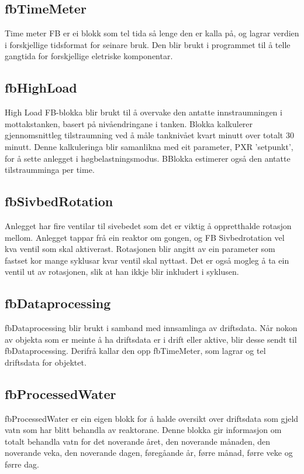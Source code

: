 \subsection{fbTimeMeter}
Time meter \gls{FB} er ei blokk som tel tida så lenge den er kalla på, og lagrar verdien i forskjellige tidsformat for seinare bruk.
Den blir brukt i programmet til å telle gangtida for forskjellige eletriske komponentar.

\subsection{fbHighLoad}
High Load \gls{FB}-blokka blir brukt til å overvake den antatte innstraumningen i mottakstanken, basert på nivåendringane i tanken.
Blokka kalkulerer gjennomsnittleg tilstraumning ved å måle tanknivået kvart minutt over totalt 30 minutt.
Denne kalkuleringa blir samanlikna med eit parameter, PXR 'setpunkt', for å sette anlegget i høgbelastningsmodus.
BBlokka estimerer også den antatte tilstraumminga per time.

\subsection{fbSivbedRotation}
Anlegget har fire ventilar til sivebedet som det er viktig å oppretthalde rotasjon mellom. Anlegget tappar frå ein reaktor om gongen, 
og \gls{FB} Sivbedrotation vel kva ventil som skal aktiverast.
Rotasjonen blir angitt av ein parameter som fastset kor mange syklusar kvar ventil skal nyttast. 
Det er også mogleg å ta ein ventil ut av rotasjonen, slik at han ikkje blir inkludert i syklusen.

\subsection{fbDataprocessing}
fbDataprocessing blir brukt i samband med innsamlinga av driftsdata. 
Når nokon av objekta som er meinte å ha driftsdata er i drift eller aktive, blir desse sendt til fbDataprocessing. Derifrå kallar den opp fbTimeMeter, som lagrar og tel driftsdata for objektet.

\subsection{fbProcessedWater}
fbProcessedWater er ein eigen blokk for å halde oversikt over driftsdata som gjeld vatn som har blitt behandla av reaktorane. 
Denne blokka gir informasjon om totalt behandla vatn for det noverande året, den noverande månaden, 
den noverande veka, den noverande dagen, føregåande år, førre månad, førre veke og førre dag.



